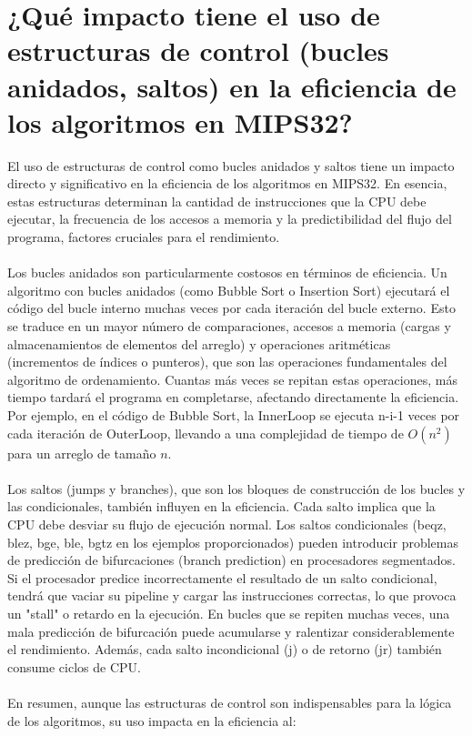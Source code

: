 \documentclass{article}
\begin{document}
\section{¿Qué impacto tiene el uso de estructuras de control (bucles anidados, saltos) en la eficiencia de los algoritmos en MIPS32?}
El uso de estructuras de control como bucles anidados y saltos tiene un impacto directo y significativo en la eficiencia de los algoritmos en MIPS32. En esencia, estas estructuras determinan la cantidad de instrucciones que la CPU debe ejecutar, la frecuencia de los accesos a memoria y la predictibilidad del flujo del programa, factores cruciales para el rendimiento.
\\
\\Los bucles anidados son particularmente costosos en términos de eficiencia. Un algoritmo con bucles anidados (como Bubble Sort o Insertion Sort) ejecutará el código del bucle interno muchas veces por cada iteración del bucle externo. Esto se traduce en un mayor número de comparaciones, accesos a memoria (cargas y almacenamientos de elementos del arreglo) y operaciones aritméticas (incrementos de índices o punteros), que son las operaciones fundamentales del algoritmo de ordenamiento. Cuantas más veces se repitan estas operaciones, más tiempo tardará el programa en completarse, afectando directamente la eficiencia. Por ejemplo, en el código de Bubble Sort, la InnerLoop se ejecuta n-i-1 veces por cada iteración de OuterLoop, llevando a una complejidad de tiempo de $O(n^2)$ para un arreglo de tamaño $n$.
\\
\\Los saltos (jumps y branches), que son los bloques de construcción de los bucles y las condicionales, también influyen en la eficiencia. Cada salto implica que la CPU debe desviar su flujo de ejecución normal. Los saltos condicionales (beqz, blez, bge, ble, bgtz en los ejemplos proporcionados) pueden introducir problemas de predicción de bifurcaciones (branch prediction) en procesadores segmentados. Si el procesador predice incorrectamente el resultado de un salto condicional, tendrá que vaciar su pipeline y cargar las instrucciones correctas, lo que provoca un "stall" o retardo en la ejecución. En bucles que se repiten muchas veces, una mala predicción de bifurcación puede acumularse y ralentizar considerablemente el rendimiento. Además, cada salto incondicional (j) o de retorno (jr) también consume ciclos de CPU.
\\
\\En resumen, aunque las estructuras de control son indispensables para la lógica de los algoritmos, su uso impacta en la eficiencia al:
\end{document}
